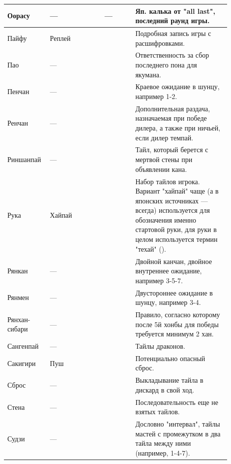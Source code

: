 \begin{tabularx}{\linewidth}{L{0.14\linewidth}L{0.13\linewidth}L{0.1\linewidth}L{0.13\linewidth}L{0.4\linewidth}}
	\midrule
	Оорасу & --- &  & --- & Яп. калька от "all last", последний раунд игры. \\
	\midrule
	Пайфу & Реплей &  &  & Подробная запись игры с расшифровками. \\
	\midrule
	Пао & --- &  &  & Ответственность за сбор последнего пона для якумана. \\
	\midrule
	Пенчан & --- &  &  & Краевое ожидание в шунцу, например 1-2. \\
	\midrule
	Ренчан & --- &  &  & Дополнительная раздача, назначаемая при победе дилера, а также при ничьей, если дилер темпай. \\
	\midrule
	Риншанпай & --- &  &   & Тайл, который берется с мертвой стены при объявлении кана. \\
	\midrule
	Рука & Хайпай &  &  & Набор тайлов игрока. Вариант "хайпай" чаще (а в японских источниках --- всегда) используется для обозначения именно стартовой руки, для руки в целом используется термин "техай" (). \\
	\midrule
	Рянкан & --- &  &  & Двойной канчан, двойное внутреннее ожидание, например 3-5-7. \\
	\midrule
	Рянмен & --- &  &  & Двустороннее ожидание в шунцу, например 3-4. \\
	\midrule
	Рянхан-сибари & --- &  &   & Правило, согласно которому после 5й хонбы для победы требуется минимум 2 хан. \\
	\midrule
	Сангенпай & --- &  &  & Тайлы драконов. \\
	\midrule
	Сакигири & Пуш &  &  & Потенциально опасный сброс. \\ 
	\midrule
	Сброс & --- &  &  & Выкладывание тайла в дискард в свой ход. \\ 
	\midrule
	Стена & --- &  &  & Последовательность еще не взятых тайлов. \\
	\midrule
	Судзи & --- &  &  & Дословно "интервал", тайлы мастей с промежутком в два тайла между ними (например, 1-4-7). \\

\end{tabularx}
